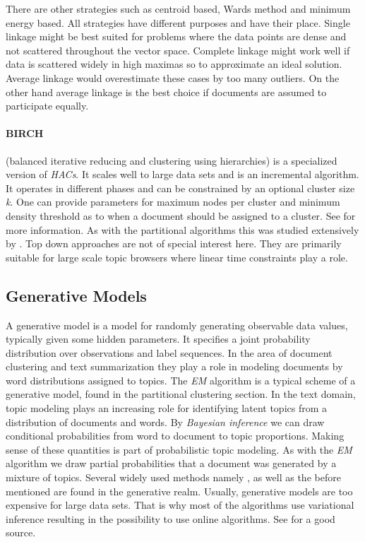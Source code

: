     There are other strategies such as centroid based, Wards method and minimum energy based.
    All strategies have different purposes and have their place. Single linkage might be best suited for problems where the data points are dense and not scattered throughout the vector space. Complete linkage might work well if data is scattered widely in high maximas so to approximate an ideal solution. Average linkage would overestimate these cases by too many outliers. On the other hand average linkage is the best choice if documents are assumed to  participate equally. 

    \paragraph{BIRCH} (balanced iterative reducing and clustering using hierarchies) is a specialized version of \emph{HACs}. It scales well to large data sets and is an incremental algorithm. It operates in different phases and can be constrained by an optional cluster size \emph{k}. One can provide parameters for maximum nodes per cluster and minimum density threshold as to when a document should be assigned to a cluster. See 
    \cite{BIRCH1996} for more information. As with the partitional algorithms this was studied extensively by \cite{ClusteringBooAggarwalk2013, ClusterAlgoSurveyIBM, IRBook2008}. Top down approaches are not of special interest here. They are primarily suitable for large scale topic browsers where linear time constraints play a role.

    \subsection{Generative Models}   
    \label{sec:generative}

      A generative model is a model for randomly generating observable data values, typically given some hidden parameters. It specifies a joint probability distribution over observations and label sequences. In the area of document clustering and text summarization they play a role in modeling documents by word distributions assigned to topics. The \emph{EM} algorithm is a typical scheme of a generative model, found in the partitional clustering section. In the text domain, topic modeling plays an increasing role for identifying latent topics from a distribution of documents and words. By \emph{Bayesian inference} we can draw conditional probabilities from word to document to topic proportions. Making sense of these quantities is part of probabilistic topic modeling. As with the \emph{EM} algorithm we draw partial probabilities that a document was generated by a mixture of topics. Several widely used methods namely \ldafull{}, \hdpfull{} as well as the before mentioned \lsafull{} are found in the generative realm. Usually, generative models are too expensive for large data sets. That is why most of the algorithms use variational inference resulting in the possibility to use online algorithms. See \cite{BishopML} for a good source.

